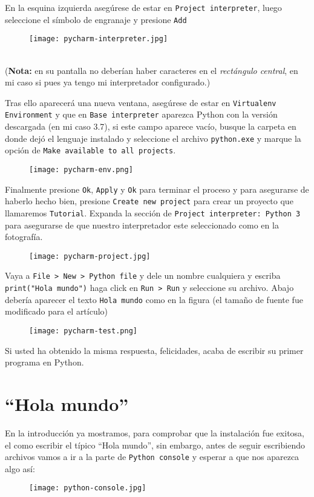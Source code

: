 \documentclass[11pt,twoside]{report}
\begin{document}
En la esquina izquierda asegúrese de estar en \texttt{Project interpreter}, luego seleccione el símbolo de engranaje y presione \texttt{Add}
\begin{figure}
\centering
\texttt{[image: pycharm-interpreter.jpg]}
\caption{}
\end{figure}\\
(\textbf{Nota:} en su pantalla no deberían haber caracteres en el \textit{rectángulo central}, en mi caso si pues ya tengo mi interpretador configurado.)

Tras ello aparecerá una nueva ventana, asegúrese de estar en \texttt{Virtualenv Environment} y que en \texttt{Base interpreter} aparezca Python con la versión descargada (en mi caso 3.7), si este campo aparece vacío, busque la carpeta en donde dejó el lenguaje instalado y seleccione el archivo \texttt{python.exe} y marque la opción de \texttt{Make available to all projects}.
\begin{figure}
\centering
\texttt{[image: pycharm-env.png]}
\caption{}
\end{figure}

Finalmente presione \texttt{Ok}, \texttt{Apply} y \texttt{Ok} para terminar el proceso y para asegurarse de haberlo hecho bien, presione \texttt{Create new project} para crear un proyecto que llamaremos \texttt{Tutorial}. Expanda la sección de \texttt{Project interpreter: Python 3} para asegurarse de que nuestro interpretador este seleccionado como en la fotografía.
\begin{figure}
\centering
\texttt{[image: pycharm-project.jpg]}
\caption{}
\end{figure}

Vaya a \texttt{File > New > Python file} y dele un nombre cualquiera y escriba \lstinline|print("Hola mundo")| haga click en \texttt{Run > Run} y seleccione su archivo. Abajo debería aparecer el texto \texttt{Hola mundo} como en la figura (el tamaño de fuente fue modificado para el artículo)
\begin{figure}
\centering
\texttt{[image: pycharm-test.png]}
\caption{}
\end{figure}

Si usted ha obtenido la misma respuesta, felicidades, acaba de escribir su primer programa en Python.

\chapter{``Hola mundo''}
En la introducción ya mostramos, para comprobar que la instalación fue exitosa, el como escribir el típico ``Hola mundo'', sin embargo, antes de seguir escribiendo archivos vamos a ir a la parte de \texttt{Python console} y esperar a que nos aparezca algo así:
\begin{figure}
\centering
\texttt{[image: python-console.jpg]}
\caption{}
\end{figure}
\end{document}
